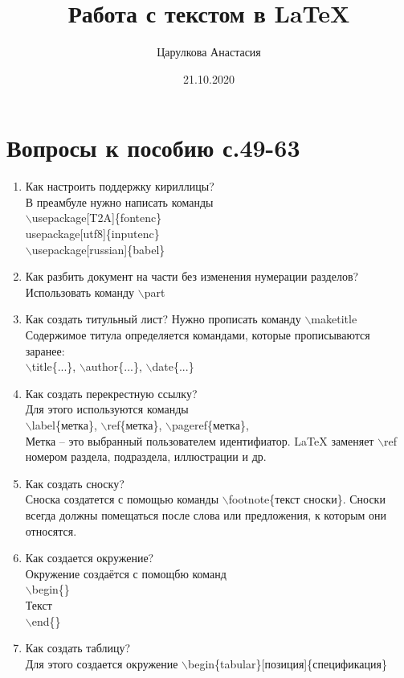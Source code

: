 \documentclass[a4paper,12pt]{article} %
\author{Царулкова Анастасия}
\title{Работа с текстом в \LaTeX{}}
\date{21.10.2020}
\begin{document}

\maketitle
\newpage
\section{Вопросы к пособию с.49-63}
\begin{enumerate}
\item Как настроить поддержку кириллицы?\\
В преамбуле нужно написать команды\\
$\backslash$usepackage[T2A]\{fontenc\}\\
usepackage[utf8]\{inputenc\}\\	
$\backslash$usepackage[russian]\{babel\}
\item Как разбить документ на части без изменения нумерации разделов?\\
Использовать команду $\backslash$part{}
\item Как создать титульный лист?
Нужно прописать команду $\backslash$maketitle
Содержимое титула определяется командами, которые прописываются заранее:\\
$\backslash$title\{...\}, $\backslash$author\{...\}, $\backslash$date\{...\}
\item Как создать перекрестную ссылку?\\
Для этого используются команды\\
$\backslash$label\{метка\}, $\backslash$ref\{метка\}, $\backslash$pageref\{метка\},\\
Метка -- это выбранный пользователем идентифиатор. \LaTeX{} заменяет $\backslash$ref номером раздела, подраздела, иллюстрации и др.
\item Как создать сноску?\\
Сноска создатется с помощью команды $\backslash$footnote\{текст сноски\}. Сноски всегда должны помещаться после слова или предложения, к которым они относятся.
\item Как создается окружение?\\
Окружение создаётся с помощбю команд \\$\backslash$begin\{\}\\
Текст\\
$\backslash$end\{\}
\item Как создать таблицу?\\
Для этого создается окружение $\backslash$begin\{tabular\}[позиция]\{спецификация\}\\

\end{enumerate}
\end{document}
